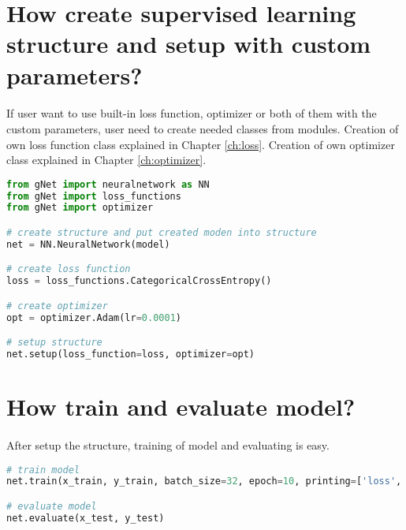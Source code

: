 \documentclass[12pt]{report}
\begin{document}
\section{How create supervised learning structure and setup with custom parameters?}
\paragraph{}
If user want to use built-in loss function, optimizer or both of them with the custom parameters, user need to create needed classes from modules. Creation of own loss function class explained in Chapter \ref{ch:loss}. Creation of own optimizer class explained in Chapter \ref{ch:optimizer}.

\begin{lstlisting}[language=Python, numbers=none, caption={Set loss function and optimizer with custom parameters.}, label={ex:setup-custom}]
from gNet import neuralnetwork as NN
from gNet import loss_functions
from gNet import optimizer

# create structure and put created moden into structure
net = NN.NeuralNetwork(model)

# create loss function
loss = loss_functions.CategoricalCrossEntropy()

# create optimizer 
opt = optimizer.Adam(lr=0.0001)

# setup structure
net.setup(loss_function=loss, optimizer=opt)

\end{lstlisting}




\section{How train and evaluate model?}
\paragraph{}
After setup the structure, training of model and evaluating is easy. 

\begin{lstlisting}[language=Python, numbers=none, caption={Train and evaluate model.}, label={ex:train}]
# train model
net.train(x_train, y_train, batch_size=32, epoch=10, printing=['loss', 'accuracy'])

# evaluate model
net.evaluate(x_test, y_test)

\end{lstlisting}
\end{document}
